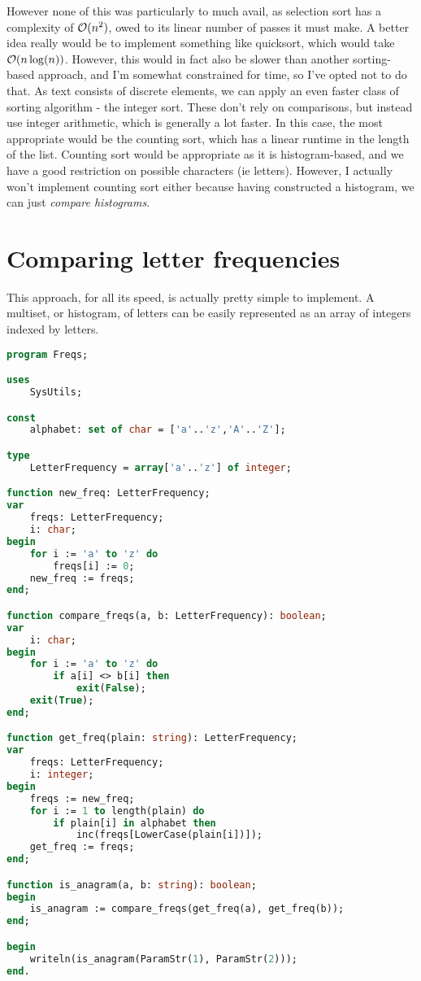\documentclass[fleqn,a4paper,11pt]{article}
\begin{document}
    However none of this was particularly to much avail, as selection sort has a
    complexity of \(\operatorname{\mathcal O}(n^2)\), owed to its linear number of passes it must
    make. A better idea really would be to implement something like quicksort,
    which would take \(\operatorname{\mathcal O}(n \log(n))\). However, this would in fact also be
    slower than another sorting-based approach, and I'm somewhat constrained for
    time, so I've opted not to do that. As text consists of discrete elements,
    we can apply an even faster class of sorting algorithm - the integer sort.
    These don't rely on comparisons, but instead use integer arithmetic, which
    is generally a lot faster. In this case, the most appropriate would be the
    counting sort, which has a linear runtime in the length of the list.
    Counting sort would be appropriate as it is histogram-based, and we have a
    good restriction on possible characters (ie letters). However, I actually
    won't implement counting sort either because having constructed a histogram,
    we can just \textit{compare histograms}.

    \section{Comparing letter frequencies}

    This approach, for all its speed, is actually pretty simple to implement. A
    multiset, or histogram, of letters can be easily represented as an array of
    integers indexed by letters.

\begin{lstlisting}[language=Pascal, caption=Basic letter frequencies in Pascal]
program Freqs;

uses
    SysUtils;

const
    alphabet: set of char = ['a'..'z','A'..'Z'];

type
    LetterFrequency = array['a'..'z'] of integer;

function new_freq: LetterFrequency;
var
    freqs: LetterFrequency;
    i: char;
begin
    for i := 'a' to 'z' do
        freqs[i] := 0;
    new_freq := freqs;
end;

function compare_freqs(a, b: LetterFrequency): boolean;
var
    i: char;
begin
    for i := 'a' to 'z' do
        if a[i] <> b[i] then
            exit(False);
    exit(True);
end;

function get_freq(plain: string): LetterFrequency;
var
    freqs: LetterFrequency;
    i: integer;
begin
    freqs := new_freq;
    for i := 1 to length(plain) do
        if plain[i] in alphabet then
            inc(freqs[LowerCase(plain[i])]);
    get_freq := freqs;
end;

function is_anagram(a, b: string): boolean;
begin
    is_anagram := compare_freqs(get_freq(a), get_freq(b));
end;

begin
    writeln(is_anagram(ParamStr(1), ParamStr(2)));
end.
\end{lstlisting}
\end{document}
